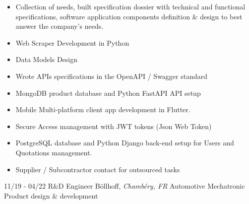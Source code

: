 \documentclass[]{friggeri-cv}
\begin{document}
\vspace{0.5mm}
\begin{itemize}
\setlength{\itemsep}{1pt}
\setlength{\parskip}{0pt}
\setlength{\parsep}{0pt}

\item Collection of needs, built specification dossier with technical and functional specifications, software application components definition \& design to best answer the company's needs.
\item Web Scraper Development in Python
\item Data Models Design
\item Wrote APIs specifications in the OpenAPI / Swagger standard
\item MongoDB product database and Python FastAPI API setup
\item Mobile Multi-platform client app development in Flutter.
\item Secure Access management with JWT tokens (Json Web Token)
\item PostgreSQL database and Python Django back-end setup for Users and Quotations management.
\item Supplier / Subcontractor contact for outsourced tasks
\end{itemize}

\begin{entrylist}
  \entry
    {11/19 - 04/22}
    {R\&D Engineer}
    {Böllhoff, \textit{Chambéry, FR}}
    {Automotive Mechatronic Product design \& development}
\end{entrylist}
\vspace{-15pt}
\end{document}
